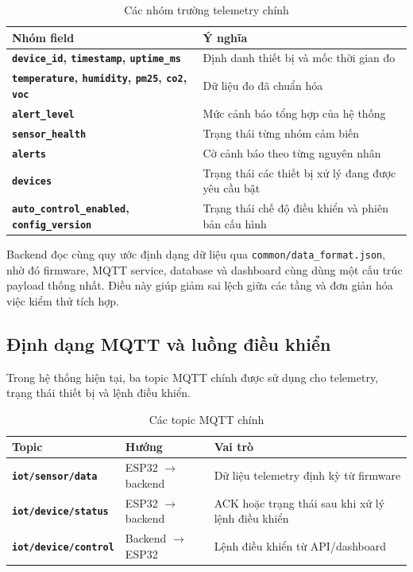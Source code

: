 \begin{table}[H]
    \centering
    \caption{Các nhóm trường telemetry chính}
    \begin{tabularx}{\textwidth}{>{\bfseries}l X}
        \toprule
        Nhóm field & Ý nghĩa \\
        \midrule
        \texttt{device\_id}, \texttt{timestamp}, \texttt{uptime\_ms} & Định danh thiết bị và mốc thời gian đo \\
        \texttt{temperature}, \texttt{humidity}, \texttt{pm25}, \texttt{co2}, \texttt{voc} & Dữ liệu đo đã chuẩn hóa \\
        \texttt{alert\_level} & Mức cảnh báo tổng hợp của hệ thống \\
        \texttt{sensor\_health} & Trạng thái từng nhóm cảm biến \\
        \texttt{alerts} & Cờ cảnh báo theo từng nguyên nhân \\
        \texttt{devices} & Trạng thái các thiết bị xử lý đang được yêu cầu bật \\
        \texttt{auto\_control\_enabled}, \texttt{config\_version} & Trạng thái chế độ điều khiển và phiên bản cấu hình \\
        \bottomrule
    \end{tabularx}
\end{table}

Backend đọc cùng quy ước định dạng dữ liệu qua \texttt{common/data\_format.json}, nhờ đó firmware,
MQTT service, database và dashboard cùng dùng một cấu trúc payload thống nhất. Điều này
giúp giảm sai lệch giữa các tầng và đơn giản hóa việc kiểm thử tích hợp.

\subsection{Định dạng MQTT và luồng điều khiển}

Trong hệ thống hiện tại, ba topic MQTT chính được sử dụng cho telemetry, trạng thái
thiết bị và lệnh điều khiển.

\begin{table}[H]
    \centering
    \caption{Các topic MQTT chính}
    \begin{tabularx}{\textwidth}{>{\bfseries}l l X}
        \toprule
        Topic & Hướng & Vai trò \\
        \midrule
        \texttt{iot/sensor/data} & ESP32 \(\rightarrow\) backend & Dữ liệu telemetry định kỳ từ firmware \\
        \texttt{iot/device/status} & ESP32 \(\rightarrow\) backend & ACK hoặc trạng thái sau khi xử lý lệnh điều khiển \\
        \texttt{iot/device/control} & Backend \(\rightarrow\) ESP32 & Lệnh điều khiển từ API/dashboard \\
        \bottomrule
    \end{tabularx}
\end{table}


